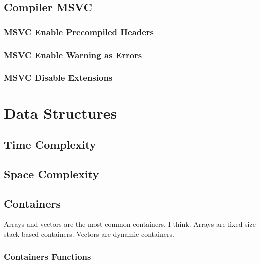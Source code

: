 \documentclass[openany]{report}
\begin{document}
\section{Compiler MSVC}

\subsection{MSVC Enable Precompiled Headers}
\subsection{MSVC Enable Warning as Errors}
\subsection{MSVC Disable Extensions}

\chapter{Data Structures}

\section{Time Complexity}

\section{Space Complexity}

\section{Containers}

Arrays and vectors are the most common containers, I think. Arrays are fixed-size stack-based containers. Vectors
are dynamic containers.

\subsection{Containers Functions}
\end{document}
